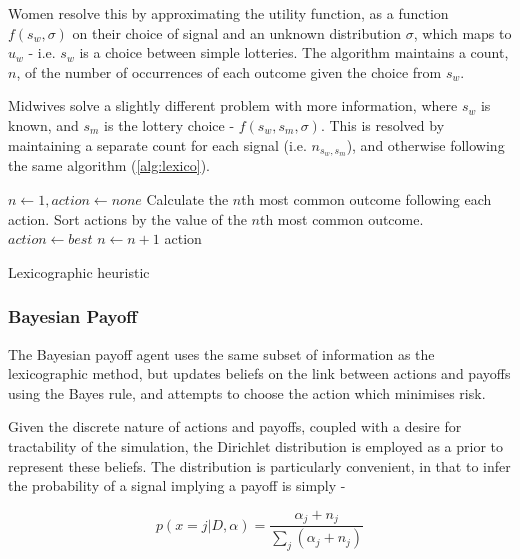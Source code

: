 Women resolve this by approximating the utility function, as a function \(f(s_{w}, \sigma)\) on their choice of signal and an unknown distribution $\sigma$, which maps to \(u_{w}\) - i.e. \(s_{w}\) is a choice between simple lotteries. The algorithm maintains a count, \(n\), of the number of occurrences of each outcome given the choice from \(s_{w}\).

Midwives solve a slightly different problem with more information, where \(s_{w}\) is known, and \(s_{m}\) is the lottery choice - \(f(s_{w}, s_{m},\sigma)\). This is resolved by maintaining a separate count for each signal (i.e. \(n_{s_{w},s_{m}}\)), and otherwise following the same algorithm (\ref{alg:lexico}).

\begin{algorithm}
\begin{algorithmic}
\State $n \gets 1, action \gets none$
\State Calculate the $n$th most common outcome following each action.
\State Sort actions by the value of the $n$th most common outcome.
 \State $action \gets best$ \EndIf
\State $n \gets n + 1$
\EndWhile
\State \Return action
\end{algorithmic}
\caption{Lexicographic heuristic\label{alg:lexico}}
\end{algorithm}

\subsubsection{Bayesian Payoff}

The Bayesian payoff agent uses the same subset of information as the lexicographic method, but updates beliefs on the link between actions and payoffs using the Bayes rule, and attempts to choose the action which minimises risk.

Given the discrete nature of actions and payoffs, coupled with a desire for tractability of the
simulation, the Dirichlet distribution is employed as a prior to represent these beliefs. 
The distribution is particularly convenient, in that to infer the
probability of a signal implying a payoff is
simply -

\begin{equation}
p(x=j|D,\alpha)=\frac{\alpha_{j}+n_{j}}{\sum_{j}(\alpha_{j}+n_{j})}\label{eq:posterior}
\end{equation}


